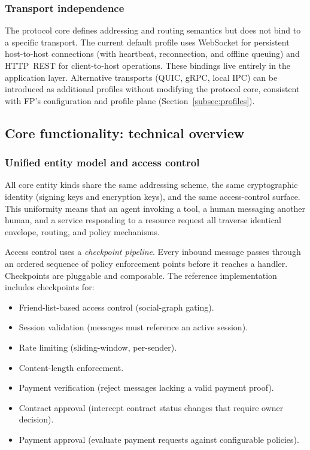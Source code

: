 \subsubsection{Transport independence}

The protocol core defines addressing and routing semantics but does not
bind to a specific transport.  The current default profile uses WebSocket
for persistent host-to-host connections (with heartbeat, reconnection,
and offline queuing) and HTTP~REST for client-to-host operations.  These
bindings live entirely in the application layer.  Alternative transports
(QUIC, gRPC, local IPC) can be introduced as additional profiles without
modifying the protocol core, consistent with FP's configuration and
profile plane (Section~\ref{subsec:profiles}).

\subsection{Core functionality: technical overview}
\label{app:functionality}

\subsubsection{Unified entity model and access control}

All core entity kinds share the same addressing scheme, the same
cryptographic identity (signing keys and encryption keys),
and the same access-control surface.  This uniformity means that an
agent invoking a tool, a human messaging another human, and a service
responding to a resource request all traverse identical envelope,
routing, and policy mechanisms.

Access control uses a \emph{checkpoint pipeline}. Every inbound message passes through an ordered sequence of policy enforcement points before it reaches a handler. Checkpoints are pluggable and composable. The reference implementation includes checkpoints for:

\begin{itemize}
    \item Friend-list-based access control (social-graph gating).
    \item Session validation (messages must reference an active session).
    \item Rate limiting (sliding-window, per-sender).
    \item Content-length enforcement.
    \item Payment verification (reject messages lacking a valid payment proof).
    \item Contract approval (intercept contract status changes that require owner decision).
    \item Payment approval (evaluate payment requests against configurable policies).
\end{itemize}

